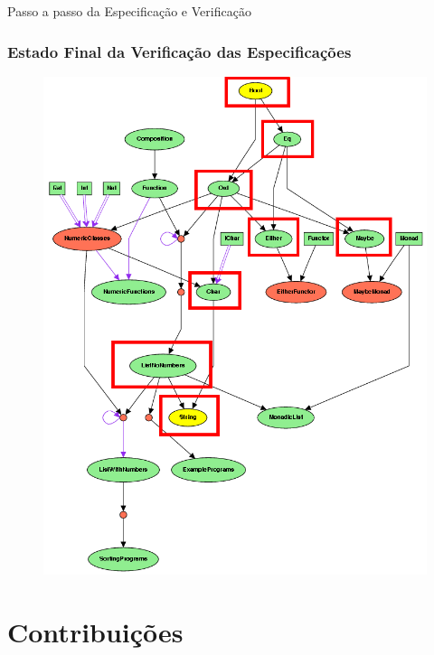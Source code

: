 \documentclass{beamer}
\begin{document}
\begin{frame}[allowframebreaks]{Passo a passo da Especificação e Verificação}
\end{frame}

\begin{frame}
	\frametitle{Estado Final da Verificação das Especificações}
\begin{figure}
\centering
\includegraphics[height=0.9\textheight]{figuras/ProofEnd.png}
\end{figure}
\end{frame}

\section{Contribuições}
\end{document}
